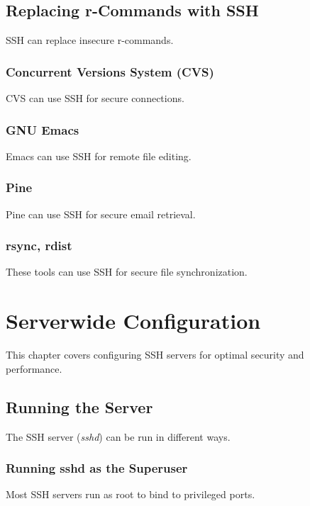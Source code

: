 \documentclass[12pt]{book}
\begin{document}
\section{Replacing r-Commands with SSH}

SSH can replace insecure r-commands.

\subsection{Concurrent Versions System (CVS)}

CVS can use SSH for secure connections.

\subsection{GNU Emacs}

Emacs can use SSH for remote file editing.

\subsection{Pine}

Pine can use SSH for secure email retrieval.

\subsection{rsync, rdist}

These tools can use SSH for secure file synchronization.

\chapter{Serverwide Configuration}

This chapter covers configuring SSH servers for optimal security and performance.

\section{Running the Server}

The SSH server (\textit{sshd}) can be run in different ways.

\subsection{Running sshd as the Superuser}

Most SSH servers run as root to bind to privileged ports.
\end{document}
